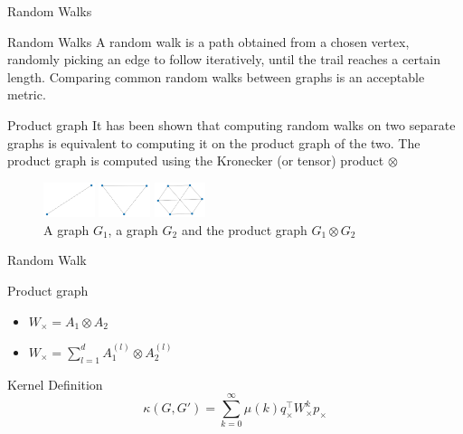 \documentclass[compress]{beamer}
\begin{document}
\begin{frame}{Random Walks}
\begin{block}{Random Walks}
	A random walk is a path obtained from a chosen vertex, randomly picking an edge to follow iteratively, until the trail reaches a certain length.
	Comparing common random walks between graphs is an acceptable metric.
\end{block}
\begin{block}{Product graph}
It has been shown\cite{imrich2000product} that computing random walks on two separate graphs is equivalent to computing it on the product graph of the two. The product graph is computed using the Kronecker (or tensor) product $\otimes$
\end{block}
\begin{figure}
\begin{multicols}{3}
\includegraphics[width=1.5cm]{data/prod_graph/g1.png}\par
\includegraphics[width=1.5cm]{data/prod_graph/g2.png}\par
\includegraphics[width=1.5cm]{data/prod_graph/gx.png}\par
\end{multicols}
\caption{A graph $G_1$, a graph $G_2$ and the product graph $G_1 \otimes G_2$}
\end{figure}
\end{frame}
\begin{frame}{Random Walk}
	\begin{block}{Product graph}
		\begin{multicols}{2}
			\begin{itemize}
				\item $W_{\times}=A_1\otimes A_2$
				\item 
				$W_{\times}=\sum\limits_{l=1}^{d} A_1^{(l)} \otimes A_2^{(l)}$\\
			\end{itemize}
		\end{multicols}
	\end{block}
	\begin{block}{Kernel Definition}
		\begin{equation*}
		\kappa(G,G') = \sum\limits_{k=0}^{\infty}\mu(k)q_{\times}^{\top}W_{\times}^{k}p_{\times}
		\end{equation*}
	\end{block}
\end{frame}
\end{document}
